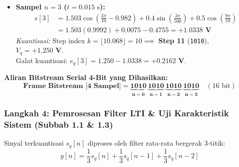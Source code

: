 \documentclass[11pt,a4paper]{article}
\begin{document}
\begin{itemize}[leftmargin=*]
  \item \textbf{Sampel $n=3$ ($t = 0.015\text{ s}$):}
  \begin{align*}
  s[3] &= 1.503 \cos\left(\frac{3\pi}{10} - 0.982\right) + 0.4 \sin\left(\frac{3\pi}{500}\right) + 0.5 \cos\left(\frac{9\pi}{10}\right) \\
  &= 1.503(0.9992) + 0.0075 - 0.4755 = \mathbf{+1.0338\text{ V}}
  \end{align*}
  \textit{Kuantisasi:} Step index $k = \lfloor 10.068 \rfloor = 10 \implies$ \textbf{Step 11} (\texttt{1010}), $V_q = \mathbf{+1.250\text{ V}}$.\\
  Galat kuantisasi: $e_q[3] = 1.250 - 1.0338 = \mathbf{+0.2162\text{ V}}$.
\end{itemize}

\vspace{0.2cm}
\textbf{Aliran Bitstream Serial 4-Bit yang Dihasilkan:}
\[
\mathbf{\text{Frame Bitstream [4 Sampel]}} = \mathbf{\underbrace{1010}_{n=0} \ \underbrace{1010}_{n=1} \ \underbrace{1010}_{n=2} \ \underbrace{1010}_{n=3}} \quad (16\text{ bit})
\]

\newpage
\subsubsection{Langkah 4: Pemrosesan Filter LTI \& Uji Karakteristik Sistem (Subbab 1.1 \& 1.3)}
Sinyal terkuantisasi $s_q[n]$ diproses oleh filter rata-rata bergerak 3-titik:
\begin{equation}
y[n] = \frac{1}{3} s_q[n] + \frac{1}{3} s_q[n-1] + \frac{1}{3} s_q[n-2]
\end{equation}
\end{document}
